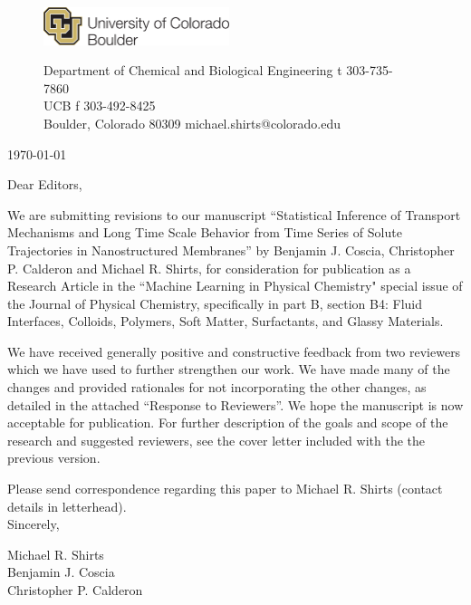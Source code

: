 \documentclass[fontsize=11pt]{article}
\begin{document}
	\graphicspath{{./figures/}}

	\begin{figure}
	\centering
	\begin{minipage}{0.37\textwidth}
	\includegraphics[width=2.14in,left]{CUBoulder.pdf}
	\end{minipage}
	\begin{minipage}{0.62\textwidth}
	\scriptsize
	\noindent Department of Chemical and Biological Engineering \hfill t 303-735-7860~~~~~~~~~~~~~~~~~~ \\
	 UCB \hfill f 303-492-8425~~~~~~~~~~~~~~~~~~ \\
	\noindent Boulder, Colorado 80309 \hfill michael.shirts@colorado.edu \\
	\end{minipage}
	\end{figure}
	
	\noindent \today

	\noindent Dear Editors,\\
	
	\newcommand{\ManuscriptTitle}{Statistical Inference of Transport Mechanisms and
	Long Time Scale Behavior from Time Series of Solute Trajectories in 
	Nanostructured Membranes}
	
	We are submitting revisions to our manuscript ``\ManuscriptTitle'' by Benjamin 
	J. Coscia, Christopher P. Calderon and Michael R. Shirts, for consideration for 
	publication as a Research Article in the ``Machine Learning in Physical Chemistry"
	special issue of the Journal of Physical Chemistry, specifically in part B, section
	B4: Fluid Interfaces, Colloids, Polymers, Soft Matter, Surfactants, and Glassy Materials.

	We have received generally positive and constructive feedback from two reviewers 
	which we have used to further strengthen our work. We have made many of the changes and
	provided rationales for not incorporating the other changes, as detailed in the attached
    ``Response to Reviewers''. We hope the manuscript is now acceptable for publication. For
    further description of the goals and scope of the research and suggested reviewers, see 
    the cover letter included with the the previous version.
	
	Please send correspondence regarding this paper to Michael R. Shirts (contact
	details in letterhead).\\	
	
	\noindent Sincerely,
	
	\noindent Michael R. Shirts \\
	\noindent Benjamin J. Coscia \\
	\noindent Christopher P. Calderon \\
	
\end{document}

